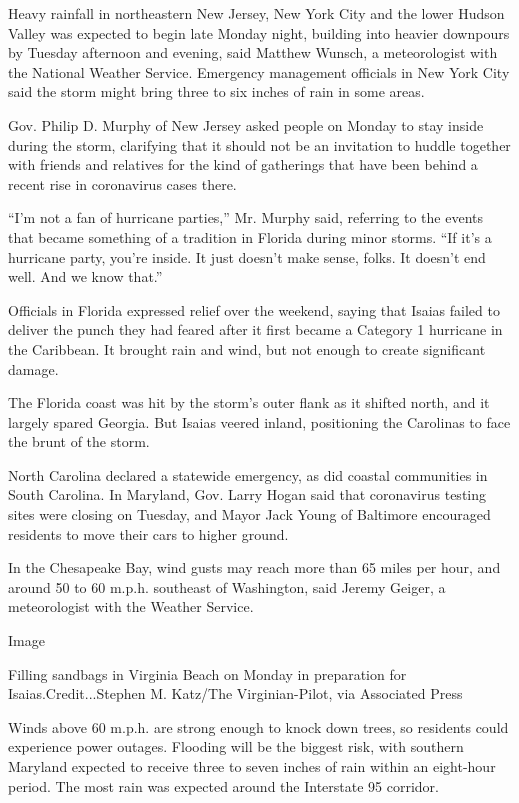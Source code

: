 Heavy rainfall in northeastern New Jersey, New York City and the lower
Hudson Valley was expected to begin late Monday night, building into
heavier downpours by Tuesday afternoon and evening, said Matthew Wunsch,
a meteorologist with the National Weather Service. Emergency management
officials in New York City said the storm might bring three to six
inches of rain in some areas.

Gov. Philip D. Murphy of New Jersey asked people on Monday to stay
inside during the storm, clarifying that it should not be an invitation
to huddle together with friends and relatives for the kind of gatherings
that have been behind a recent rise in coronavirus cases there.

``I'm not a fan of hurricane parties,'' Mr. Murphy said, referring to
the events that became something of a tradition in Florida during minor
storms. ``If it's a hurricane party, you're inside. It just doesn't make
sense, folks. It doesn't end well. And we know that.''

Officials in Florida expressed relief over the weekend, saying that
Isaias failed to deliver the punch they had feared after it first became
a Category 1 hurricane in the Caribbean. It brought rain and wind, but
not enough to create significant damage.

The Florida coast was hit by the storm's outer flank as it shifted
north, and it largely spared Georgia. But Isaias veered inland,
positioning the Carolinas to face the brunt of the storm.

North Carolina declared a statewide emergency, as did coastal
communities in South Carolina. In Maryland, Gov. Larry Hogan said that
coronavirus testing sites were closing on Tuesday, and Mayor Jack Young
of Baltimore encouraged residents to move their cars to higher ground.

In the Chesapeake Bay, wind gusts may reach more than 65 miles per hour,
and around 50 to 60 m.p.h. southeast of Washington, said Jeremy Geiger,
a meteorologist with the Weather Service.

Image

Filling sandbags in Virginia Beach on Monday in preparation for
Isaias.Credit...Stephen M. Katz/The Virginian-Pilot, via Associated
Press

Winds above 60 m.p.h. are strong enough to knock down trees, so
residents could experience power outages. Flooding will be the biggest
risk, with southern Maryland expected to receive three to seven inches
of rain within an eight-hour period. The most rain was expected around
the Interstate 95 corridor.


